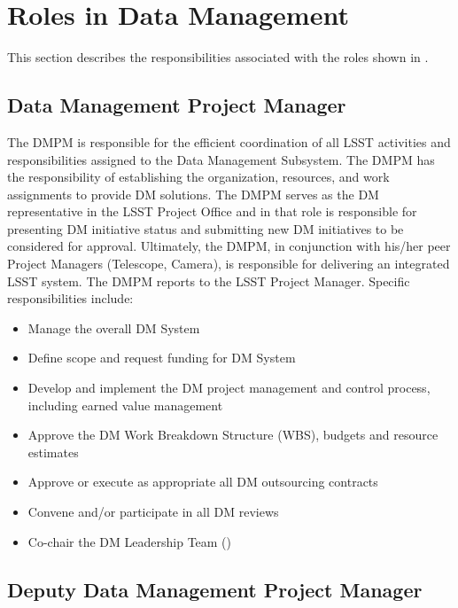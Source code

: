 \section{Roles in \gls{Data Management}}

This section describes the responsibilities associated with the roles shown in
.


\subsection{Data Management Project Manager}\label{role:dmpm}

The \gls{DMPM} is responsible for the efficient coordination of all \gls{LSST} activities and responsibilities assigned to the \gls{Data Management} \gls{Subsystem}. The \gls{DMPM} has the responsibility of establishing the organization, resources, and work assignments to provide \gls{DM} solutions.  The \gls{DMPM} serves as the \gls{DM} representative in the \gls{LSST} Project Office and in that role is responsible for presenting \gls{DM} initiative status and submitting new \gls{DM} initiatives to be considered for approval. Ultimately, the \gls{DMPM}, in conjunction with his/her peer Project Managers (Telescope, \gls{Camera}), is responsible for delivering an integrated \gls{LSST} system. The \gls{DMPM} reports to the \gls{LSST} \gls{Project Manager}. Specific responsibilities include:

\begin{itemize}
\item Manage the overall \gls{DM} System
\item Define scope and request funding for \gls{DM} System
\item Develop and implement the \gls{DM} project management and control process, including earned value management
\item Approve the \gls{DM} \gls{Work Breakdown Structure} (\gls{WBS}), budgets and resource estimates
\item Approve or execute as appropriate all \gls{DM} outsourcing contracts
\item Convene and/or participate in all \gls{DM} reviews
\item Co-chair the \gls{DM} Leadership Team ()
\end{itemize}

\subsection{Deputy Data Management Project Manager}\label{role:ddmpm}


